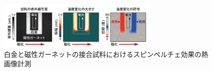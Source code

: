 \documentclass[10pt]{ujarticle}
\begin{document}
\begin{figure}[h]
  \begin{center}
    \includegraphics[width=8cm]{./screenshot3.png}
    \caption{白金と磁性ガーネットの接合試料におけるスピンペルチェ効果の熱画像計測}
  \end{center}
\end{figure}
\end{document}
